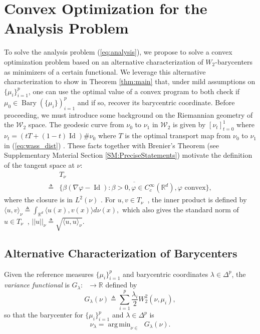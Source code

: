 \documentclass[nohyperref]{article}
\DeclareMathOperator*{\argmin}{arg\,min}
\DeclareMathOperator*{\bary}{Bary}
\DeclareMathOperator*{\id}{Id}
\DeclareMathOperator{\Pac}{\mathcal{P}_{2,ac}(\mathbb{R}^d)}
\theoremstyle{definition}
\begin{document}
\section{Convex Optimization for the Analysis Problem}\label{sec:Theory}

To solve the analysis problem (\ref{eq:analysis}), we propose to solve a convex optimization problem based on an alternative characterization of $W_{2}$-barycenters as minimizers of a certain functional. We leverage this alternative characterization to show in Theorem \ref{thm:main} that, under mild assumptions on $\{\mu_{i}\}_{i=1}^{p}$, one can use the optimal value of a convex program to both check if $\mu_{0}\in\bary(\{\mu_{i}\})_{i=1}^{p}$ and if so, recover its barycentric coordinate. 
Before proceeding, we must introduce some background on the Riemannian geometry of the $\mathcal{W}_{2}$ space.  The geodesic curve from $\nu_0$ to $\nu_1$ in $\mathcal{W}_{2}$ is given by $[\nu_t]_{t=0}^1$ where $\nu_t = (tT + (1-t)\id)\#\nu_0$ where $T$ is the optimal transport map from $\nu_0$ to $\nu_1$ in (\ref{eq:wass_dist}) \cite{santambrogio2015optimal}.  These facts together with Brenier's Theorem (see Supplementary Material Section \ref{SM:PreciseStatements}) motivate the definition of the tangent space at $\nu$: \begin{align*}
    &T_\nu\Pac \\
\triangleq&\overline{\{\beta (\nabla \varphi - \id): \beta > 0, \varphi \in C_c^\infty(\mathbb{R}^d), \varphi \text{ convex}\}},
\end{align*} where the closure is in $L^{2}(\nu)$ \citep{ambrosio2005gradient}.  For $u,v \in T_\nu\Pac$, the inner product is defined by $\langle u, v \rangle_\nu \triangleq \int_{\mathbb{R}^d} \langle u(x), v(x) \rangle d\nu(x),$
which also gives the standard norm of $u \in T_\nu\Pac$, $||u||_\nu \triangleq \sqrt{\langle u, u\rangle_{\nu}}$.

\subsection{Alternative Characterization of Barycenters} 

Given the  reference measures $\{\mu_i\}_{i=1}^p$ and barycentric coordinates $\lambda \in \Delta^p$, the \emph{variance functional} is $G_{\lambda} : \Pac \rightarrow \mathbb{R}$ defined by $$\displaystyle G_{\lambda}(\nu) \triangleq \sum_{i=1}^p \frac{\lambda_i}{2} W_2^2(\nu, \mu_i),$$ so that the barycenter for $\{\mu_i\}_{i=1}^p$ and $\lambda \in \Delta^p$ is
$$\nu_{\lambda} =\displaystyle\argmin_{\nu \in \Pac} G_{\lambda}(\nu).$$
\end{document}
